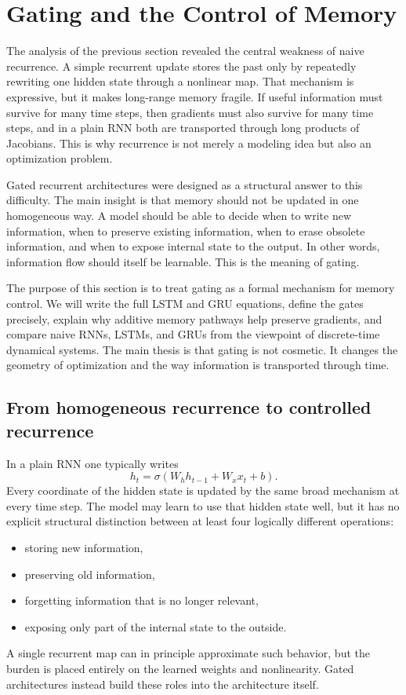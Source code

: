 \section{Gating and the Control of Memory}

The analysis of the previous section revealed the central weakness of naive recurrence.
A simple recurrent update stores the past only by repeatedly rewriting one hidden state through a nonlinear map.
That mechanism is expressive, but it makes long-range memory fragile.
If useful information must survive for many time steps, then gradients must also survive for many time steps, and in a plain RNN both are transported through long products of Jacobians.
This is why recurrence is not merely a modeling idea but also an optimization problem.

\medskip

Gated recurrent architectures were designed as a structural answer to this difficulty.
The main insight is that memory should not be updated in one homogeneous way.
A model should be able to decide when to write new information, when to preserve existing information, when to erase obsolete information, and when to expose internal state to the output.
In other words, information flow should itself be learnable.
This is the meaning of gating.

\medskip

The purpose of this section is to treat gating as a formal mechanism for memory control.
We will write the full LSTM and GRU equations, define the gates precisely, explain why additive memory pathways help preserve gradients, and compare naive RNNs, LSTMs, and GRUs from the viewpoint of discrete-time dynamical systems.
The main thesis is that gating is not cosmetic.
It changes the geometry of optimization and the way information is transported through time.

\subsection*{From homogeneous recurrence to controlled recurrence}

In a plain RNN one typically writes
\[
 h_t = \sigma(W_h h_{t-1} + W_x x_t + b).
\]
Every coordinate of the hidden state is updated by the same broad mechanism at every time step.
The model may learn to use that hidden state well, but it has no explicit structural distinction between at least four logically different operations:
\begin{itemize}
    \item storing new information,
    \item preserving old information,
    \item forgetting information that is no longer relevant,
    \item exposing only part of the internal state to the outside.
\end{itemize}
A single recurrent map can in principle approximate such behavior, but the burden is placed entirely on the learned weights and nonlinearity.
Gated architectures instead build these roles into the architecture itself.

